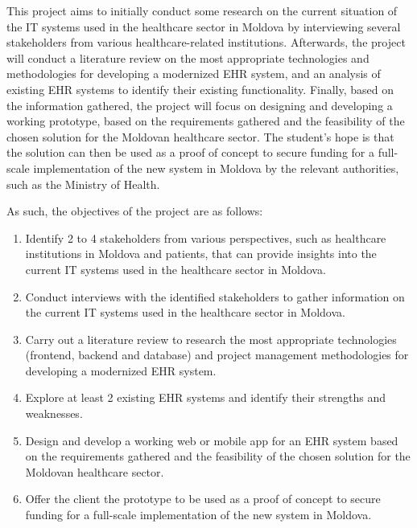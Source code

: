 This project aims to initially conduct some research on the current situation of the IT systems used in the healthcare sector in Moldova by interviewing several stakeholders from various healthcare-related institutions. Afterwards, the project will conduct a literature review on the most appropriate technologies and methodologies for developing a modernized EHR system, and an analysis of existing EHR systems to identify their existing functionality. Finally, based on the information gathered, the project will focus on designing and developing a working prototype, based on the requirements gathered and the feasibility of the chosen solution for the Moldovan healthcare sector. The student's hope is that the solution can then be used as a proof of concept to secure funding for a full-scale implementation of the new system in Moldova by the relevant authorities, such as the Ministry of Health.

As such, the objectives of the project are as follows:
\begin{enumerate}   
    \item Identify 2 to 4 stakeholders from various perspectives, such as healthcare institutions in Moldova and patients, that can provide insights into the current IT systems used in the healthcare sector in Moldova.
    \item Conduct interviews with the identified stakeholders to gather information on the current IT systems used in the healthcare sector in Moldova.
    \item Carry out a literature review to research the most appropriate technologies (frontend, backend and database) and project management methodologies for developing a modernized EHR system.
    \item Explore at least 2 existing EHR systems and identify their strengths and weaknesses.
    \item Design and develop a working web or mobile app for an EHR system based on the requirements gathered and the feasibility of the chosen solution for the Moldovan healthcare sector.
    \item Offer the client the prototype to be used as a proof of concept to secure funding for a full-scale implementation of the new system in Moldova.
\end{enumerate}